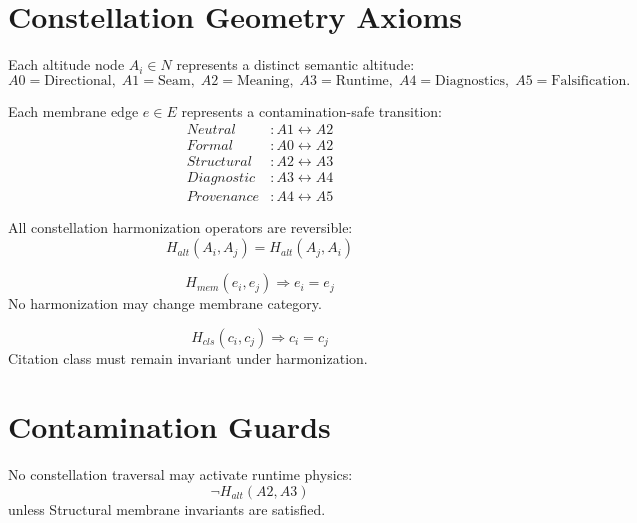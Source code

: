 \documentclass[11pt]{article}
\begin{document}
\section{Constellation Geometry Axioms}

\begin{axiom}
Each altitude node $A_i \in N$ represents a distinct semantic altitude:
\[
A0 = \text{Directional},\;
A1 = \text{Seam},\;
A2 = \text{Meaning},\;
A3 = \text{Runtime},\;
A4 = \text{Diagnostics},\;
A5 = \text{Falsification}.
\]
\end{axiom}

\begin{axiom}
Each membrane edge $e \in E$ represents a contamination-safe transition:
\[
\begin{aligned}
Neutral &: A1 \leftrightarrow A2 \\
Formal &: A0 \leftrightarrow A2 \\
Structural &: A2 \leftrightarrow A3 \\
Diagnostic &: A3 \leftrightarrow A4 \\
Provenance &: A4 \leftrightarrow A5
\end{aligned}
\]
\end{axiom}

\begin{axiom}[Reversibility]
All constellation harmonization operators are reversible:
\[
H_{alt}(A_i, A_j) = H_{alt}(A_j, A_i)
\]
\end{axiom}

\begin{axiom}
\[
H_{mem}(e_i, e_j) \Rightarrow e_i = e_j
\]
No harmonization may change membrane category.
\end{axiom}

\begin{axiom}
\[
H_{cls}(c_i, c_j) \Rightarrow c_i = c_j
\]
Citation class must remain invariant under harmonization.
\end{axiom}

\section{Contamination Guards}

\begin{axiom}
No constellation traversal may activate runtime physics:
\[
\neg H_{alt}(A2, A3)
\]
unless Structural membrane invariants are satisfied.
\end{axiom}
\end{document}
